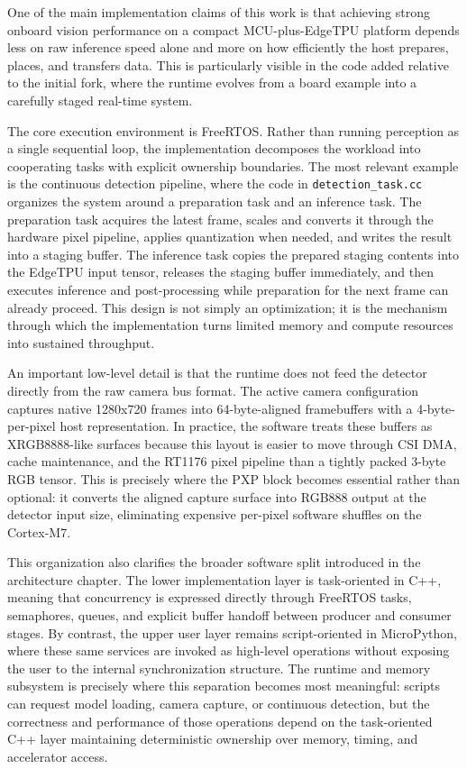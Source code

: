 One of the main implementation claims of this work is that achieving
strong onboard vision performance on a compact MCU-plus-EdgeTPU platform
depends less on raw inference speed alone and more on how efficiently
the host prepares, places, and transfers data. This is particularly
visible in the code added relative to the initial fork, where the
runtime evolves from a board example into a carefully staged real-time
system.

The core execution environment is FreeRTOS. Rather than running
perception as a single sequential loop, the implementation decomposes
the workload into cooperating tasks with explicit ownership boundaries.
The most relevant example is the continuous detection pipeline, where
the code in \texttt{detection\_task.cc} organizes the system around a
preparation task and an inference task. The preparation task acquires
the latest frame, scales and converts it through the hardware pixel
pipeline, applies quantization when needed, and writes the result into a
staging buffer. The inference task copies the prepared staging contents
into the EdgeTPU input tensor, releases the staging buffer immediately,
and then executes inference and post-processing while preparation for
the next frame can already proceed. This design is not simply an
optimization; it is the mechanism through which the implementation turns
limited memory and compute resources into sustained throughput.

An important low-level detail is that the runtime does not feed the
detector directly from the raw camera bus format. The active camera
configuration captures native 1280x720 frames into 64-byte-aligned
framebuffers with a 4-byte-per-pixel host representation. In practice,
the software treats these buffers as XRGB8888-like surfaces because this
layout is easier to move through CSI DMA, cache maintenance, and the
RT1176 pixel pipeline than a tightly packed 3-byte RGB tensor. This is
precisely where the PXP block becomes essential rather than optional: it
converts the aligned capture surface into RGB888 output at the detector
input size, eliminating expensive per-pixel software shuffles on the
Cortex-M7.

This organization also clarifies the broader software split introduced
in the architecture chapter. The lower implementation layer is
task-oriented in C++, meaning that concurrency is expressed directly
through FreeRTOS tasks, semaphores, queues, and explicit buffer handoff
between producer and consumer stages. By contrast, the upper user layer
remains script-oriented in MicroPython, where these same services are
invoked as high-level operations without exposing the user to the
internal synchronization structure. The runtime and memory subsystem is
precisely where this separation becomes most meaningful: scripts can
request model loading, camera capture, or continuous detection, but the
correctness and performance of those operations depend on the
task-oriented C++ layer maintaining deterministic ownership over memory,
timing, and accelerator access.

